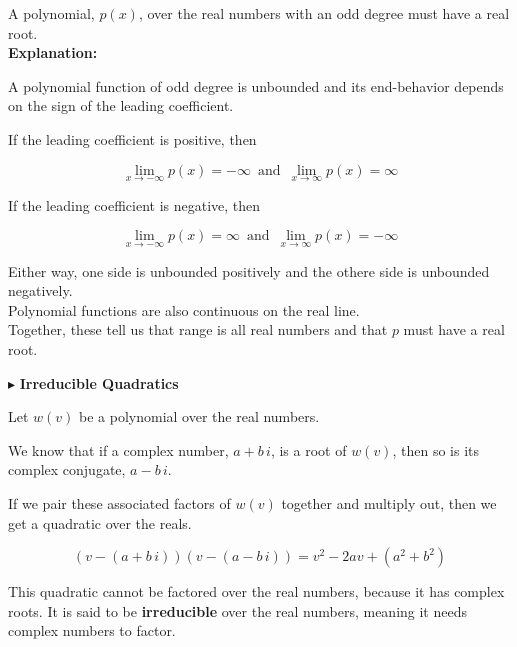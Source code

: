 \documentclass{ximera}
\begin{document}
\begin{explanation}


A polynomial, $p(x)$, over the real numbers with an odd degree must have a real root. \\



\textbf{Explanation: }



A polynomial function of odd degree is unbounded and its end-behavior depends on the sign of the leading coefficient.



If the leading coefficient is positive, then 

\[   \lim\limits_{x \to -\infty} p(x) = -\infty    \,   \text{ and } \,       \lim\limits_{x \to \infty} p(x) = \infty      \]



If the leading coefficient is negative, then 

\[   \lim\limits_{x \to -\infty} p(x) = \infty    \,   \text{ and } \,       \lim\limits_{x \to \infty} p(x) = -\infty      \]


Either way, one side is unbounded positively and the othere side is unbounded negatively. \\



Polynomial functions are also continuous on the real line. \\


Together, these tell us that range is all real numbers and that $p$ must have a real root.




\end{explanation}








$\blacktriangleright$  \textbf{Irreducible Quadratics}


Let $w(v)$ be a polynomial over the real numbers.

We know that if a complex number, $a + b \, i$, is a root of $w(v)$, then so is its complex conjugate, $a - b \,i$.

If we pair these associated factors of $w(v)$ together and multiply out, then we get a quadratic over the reals.

\[    (v - (a + b \, i)) (v -(a - b \, i))  = v^2 - 2a v + (a^2 + b^2)      \]


This quadratic cannot be factored over the real numbers, because it has complex roots.  It is said to be \textbf{irreducible} over the real numbers, meaning it needs complex numbers to factor.
\end{document}
